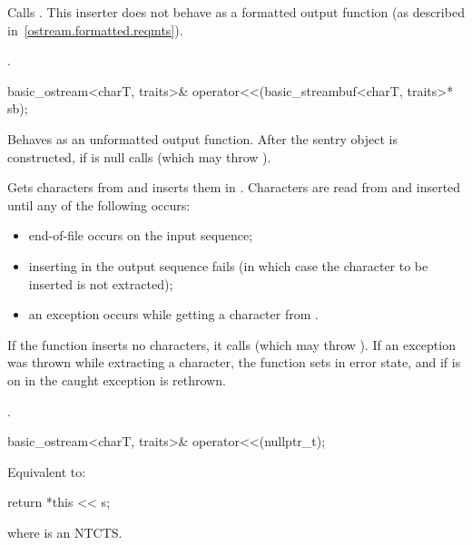 \begin{itemdescr}
\pnum
\effects
Calls
.
This inserter does not
behave as a formatted output function (as described in~\ref{ostream.formatted.reqmts}).

\pnum
\returns
{}.
\end{itemdescr}

%
\begin{itemdecl}
basic_ostream<charT, traits>& operator<<(basic_streambuf<charT, traits>* sb);
\end{itemdecl}

\begin{itemdescr}
\pnum
\effects
Behaves as an unformatted output function.
After the sentry object is
constructed, if
 is null calls
(which may throw
).

\pnum
Gets characters from 
and inserts them in
.
Characters are read from 
and inserted until any of the following occurs:
\begin{itemize}
\item
end-of-file occurs on the input sequence;
\item
inserting in the output sequence fails
(in which case the character to be inserted is not extracted);
\item
an exception occurs while getting a character from .
\end{itemize}

\pnum
If the function inserts no characters, it calls
(which may throw
).
If an exception was thrown while extracting a character,
the function sets
in error state, and if
is on in
the caught exception is rethrown.

\pnum
\returns
{}.
\end{itemdescr}

%
\begin{itemdecl}
basic_ostream<charT, traits>& operator<<(nullptr_t);
\end{itemdecl}

\begin{itemdescr}
\pnum
\effects
Equivalent to:
\begin{codeblock}
return *this << s;
\end{codeblock}
where  is an
NTCTS.
\end{itemdescr}

